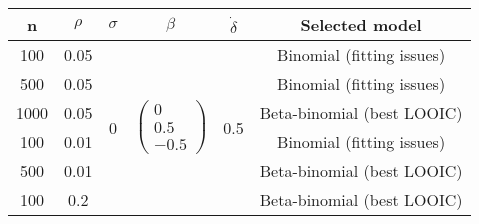 \begin{table}[h!]
\centering
\begin{tabular}{||c c c c c c||} 
\hline
n      &$\rho$& $\sigma$ & $\beta$ & $\dot{\delta}$ & Selected model \\ [0.5ex] 
 \hline\hline
100  & 0.05  &  \multirow{6}{*}{0} & \multirow{6}{*}{$\begin{pmatrix} 0 \\ 0.5 \\ -0.5\end{pmatrix}$} 
& \multirow{6}{*}{0.5}& Binomial (fitting issues)\\
500  & 0.05  & & & & Binomial (fitting issues)\\
1000& 0.05  & & & & Beta-binomial (best LOOIC)\\
100  & 0.01  & & & & Binomial (fitting issues)\\
500  & 0.01  & & & & Beta-binomial (best LOOIC)\\
100  & 0.2    & & & & Beta-binomial (best LOOIC)\\ [1ex] 

 \hline
 \end{tabular}
\end{table}